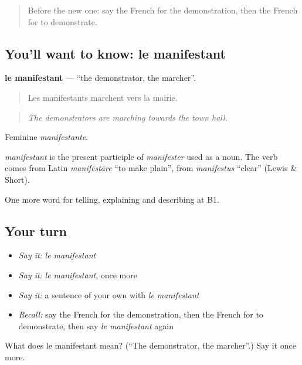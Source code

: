 \begin{quote}
Before the new one: say the French for the demonstration, then the French for to demonstrate.
\end{quote}

\subsection*{You'll want to know: le manifestant}
\textbf{le manifestant} — \textquotedblleft{}the demonstrator, the marcher\textquotedblright{}.

\begin{quote}
Les manifestants marchent vers la mairie.
\end{quote}

\begin{quote}
\emph{The demonstrators are marching towards the town hall.}
\end{quote}

Feminine \emph{manifestante}.

\begin{cousinweb}
\emph{manifestant} is the present participle of \emph{manifester} used as a noun. The verb comes from Latin \emph{manifēstāre} \textquotedblleft{}to make plain\textquotedblright{}, from \emph{manifestus} \textquotedblleft{}clear\textquotedblright{} (Lewis \& Short).
\end{cousinweb}

\begin{grammarlens}[title={What you've built}]
One more word for telling, explaining and describing at B1.
\end{grammarlens}

\subsection*{Your turn}
\begin{itemize}
\raggedright
  \item \emph{Say it:} \emph{le manifestant}
  \item \emph{Say it:} \emph{le manifestant}, once more
  \item \emph{Say it:} a sentence of your own with \emph{le manifestant}
  \item \emph{Recall:} say the French for the demonstration, then the French for to demonstrate, then say \emph{le manifestant} again
\end{itemize}

\begin{tcolorbox}[breakable,colback=teal!4,colframe=teal!35!black,title={Before you move on}]
What does le manifestant mean? (\textquotedblleft{}The demonstrator, the marcher\textquotedblright{}.) Say it once more.
\end{tcolorbox}
